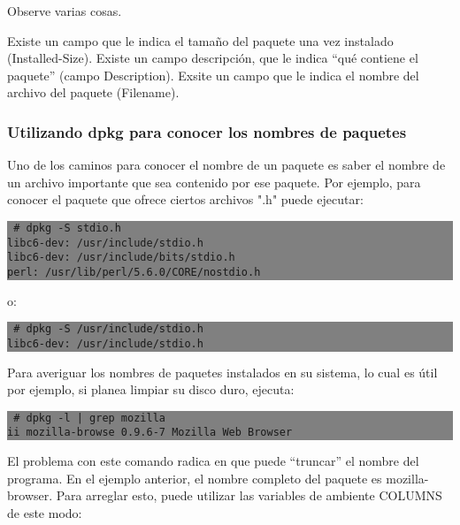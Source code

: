 \documentclass[12pt]{article}
\begin{document}
Observe varias cosas.

Existe un campo que le indica el tamaño del paquete una vez instalado (Installed-Size).
Existe un campo descripción, que le indica ``qué contiene el paquete'' (campo Description).
Exsite un campo que le indica el nombre del archivo del paquete (Filename).



\subsubsection*{Utilizando dpkg para conocer los nombres de paquetes}

Uno de los caminos para conocer el nombre de un paquete es saber el nombre de un archivo importante que sea contenido por ese paquete. Por ejemplo, para conocer el paquete que ofrece ciertos archivos ".h" puede ejecutar:

\colorbox{grey}{\parbox[t]{0.95\linewidth}{ \vspace*{0.5cm} {\tt
     \# dpkg -S stdio.h\\
     libc6-dev: /usr/include/stdio.h\\
     libc6-dev: /usr/include/bits/stdio.h\\
     perl: /usr/lib/perl/5.6.0/CORE/nostdio.h\\
 } \vspace*{0.5cm} } } 

o:

\colorbox{grey}{\parbox[t]{0.95\linewidth}{ \vspace*{0.5cm} {\tt
     \# dpkg -S /usr/include/stdio.h \\
     libc6-dev: /usr/include/stdio.h \\
 } \vspace*{0.5cm} } } 

Para averiguar los nombres de paquetes instalados en su sistema, lo cual es útil por ejemplo, si planea limpiar su disco duro, ejecuta:

\colorbox{grey}{\parbox[t]{0.95\linewidth}{ \vspace*{0.5cm} {\tt
     \# dpkg -l | grep mozilla \\
     ii  mozilla-browse 0.9.6-7        Mozilla Web Browser \\
 } \vspace*{0.5cm} } } 

El problema con este comando radica en que puede ``truncar'' el nombre del programa. En el ejemplo anterior, el nombre completo del paquete es mozilla-browser. Para arreglar esto, puede utilizar las variables de ambiente COLUMNS de este modo:
\end{document}
